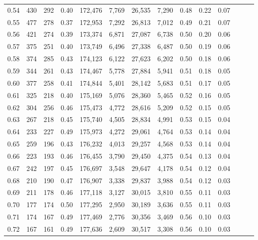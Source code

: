 \begin{tabular}{rrrrrrrrrrrrrr}
0.54 &    430 &  292 &  0.40 &  172,476 &    7,769 &  26,535 &   7,290 &  0.48 &  0.22 &      0.07 \\
0.55 &    477 &  278 &  0.37 &  172,953 &    7,292 &  26,813 &   7,012 &  0.49 &  0.21 &      0.07 \\
0.56 &    421 &  274 &  0.39 &  173,374 &    6,871 &  27,087 &   6,738 &  0.50 &  0.20 &      0.06 \\
0.57 &    375 &  251 &  0.40 &  173,749 &    6,496 &  27,338 &   6,487 &  0.50 &  0.19 &      0.06 \\
0.58 &    374 &  285 &  0.43 &  174,123 &    6,122 &  27,623 &   6,202 &  0.50 &  0.18 &      0.06 \\
0.59 &    344 &  261 &  0.43 &  174,467 &    5,778 &  27,884 &   5,941 &  0.51 &  0.18 &      0.05 \\
0.60 &    377 &  258 &  0.41 &  174,844 &    5,401 &  28,142 &   5,683 &  0.51 &  0.17 &      0.05 \\
0.61 &    325 &  218 &  0.40 &  175,169 &    5,076 &  28,360 &   5,465 &  0.52 &  0.16 &      0.05 \\
0.62 &    304 &  256 &  0.46 &  175,473 &    4,772 &  28,616 &   5,209 &  0.52 &  0.15 &      0.05 \\
0.63 &    267 &  218 &  0.45 &  175,740 &    4,505 &  28,834 &   4,991 &  0.53 &  0.15 &      0.04 \\
0.64 &    233 &  227 &  0.49 &  175,973 &    4,272 &  29,061 &   4,764 &  0.53 &  0.14 &      0.04 \\
0.65 &    259 &  196 &  0.43 &  176,232 &    4,013 &  29,257 &   4,568 &  0.53 &  0.14 &      0.04 \\
0.66 &    223 &  193 &  0.46 &  176,455 &    3,790 &  29,450 &   4,375 &  0.54 &  0.13 &      0.04 \\
0.67 &    242 &  197 &  0.45 &  176,697 &    3,548 &  29,647 &   4,178 &  0.54 &  0.12 &      0.04 \\
0.68 &    210 &  190 &  0.47 &  176,907 &    3,338 &  29,837 &   3,988 &  0.54 &  0.12 &      0.03 \\
0.69 &    211 &  178 &  0.46 &  177,118 &    3,127 &  30,015 &   3,810 &  0.55 &  0.11 &      0.03 \\
0.70 &    177 &  174 &  0.50 &  177,295 &    2,950 &  30,189 &   3,636 &  0.55 &  0.11 &      0.03 \\
0.71 &    174 &  167 &  0.49 &  177,469 &    2,776 &  30,356 &   3,469 &  0.56 &  0.10 &      0.03 \\
0.72 &    167 &  161 &  0.49 &  177,636 &    2,609 &  30,517 &   3,308 &  0.56 &  0.10 &      0.03 \\

\end{tabular}
